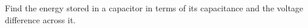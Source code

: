Find the energy stored in a capacitor in terms of its
        capacitance and the voltage difference across it.\answercheck
